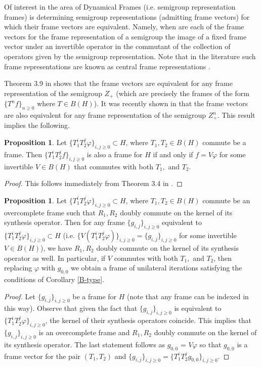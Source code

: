 \documentclass[12pt,reqno]{amsart}
\theoremstyle{definition}
\theoremstyle{definition}
\newtheorem{proposition}[theorem]{Proposition}
\numberwithin{equation}{section}
\begin{document}
Of interest in the area of Dynamical Frames (i.e. semigroup representation frames)  is determining semigroup representations (admitting frame vectors) for which their frame vectors are equivalent. Namely, when are each of the frame vectors for the frame representation of a semigroup the image of a fixed frame vector under an invertible operator in the commutant of the collection of operators given by the semigroup representation. Note that in the literature such frame representations are known as central frame representations \cite{BHKLL25}. 


Theorem 3.9 in \cite{CHP20} shows that the frame vectors are equivalent for any frame representation of the semigroup $Z_+$ (which are precisely the frames of the form $\{T^n f\}_{n\geq 0}$ where $T \in B(H)$). It was recently shown in \cite{BHKLL25} that the frame vectors are also equivalent for any frame representation of the semigroup $Z_+^n$. This result implies the following.

\begin{proposition}
   Let $\{T_1^iT_2^j \varphi\}_{i,j \geq 0} \subset H$, where $T_1, T_2  \in B(H)$ commute be a frame.  Then $\{T_1^iT_2^j f\}_{i,j \geq 0}$ is also a frame for $H$ if and only if $f = V \varphi$ for some invertible $V \in B(H)$ that commutes with both $T_1,$ and $T_2$.
   
\end{proposition}
\begin{proof}
    This follows immediately from Theorem 3.4 in \cite{BHKLL25}.
\end{proof}
\begin{proposition}
   Let $\{T_1^iT_2^j \varphi\}_{i,j \geq 0} \subset H$, where $T_1, T_2 \in B(H)$ commute be an overcomplete frame such that $R_1, R_2$ doubly commute on the kernel of its synthesis operator. Then for any frame $\{g_{i,j}\}_{i,j \geq 0} $  equivalent to $\{T_1^iT_2^j \varphi\}_{i,j \geq 0} \subset H$ (i.e. $ \{V(T_1^iT_2^j \varphi)\}_{i,j \geq 0} =  \{g_{i,j}\}_{i,j \geq 0}$ for some invertible $V \in B(H)$), we have $R_1, R_2$ doubly commute on the kernel of its synthesis operator as well. In particular, if $V$ commutes with both $T_1,$ and $T_2$, then replacing $\varphi$ with $g_{0 , 0}$ we obtain a frame of unilateral iterations satisfying the conditions of Corollary \ref{B-type}.
\end{proposition}

\begin{proof}
    Let $\{g_{i,j}\}_{i,j \geq 0} $ be a frame for $H$ (note that any frame can be indexed in this way). Observe that given the fact that  $\{g_{i,j}\}_{i,j \geq 0} $ is equivalent to $ \{T_1^iT_2^j \varphi\}_{i,j \geq 0}$,  the kernel of their synthesis operators coincide. This implies that $\{g_{i,j}\}_{i,j \geq 0} $ is an overcomplete frame and  $R_1, R_2$ doubly commute on the kernel of its  synthesis operator. The last statement follows as $g_{0 , 0}$ = $V\varphi$ so that $g_{0 , 0}$ is a frame vector for the pair $(T_1, T_2)$ and $\{g_{i,j}\}_{i,j \geq 0} = \{T_1^iT_2^j g_{0 , 0}\}_{i,j \geq 0}$.
\end{proof}
\end{document}
